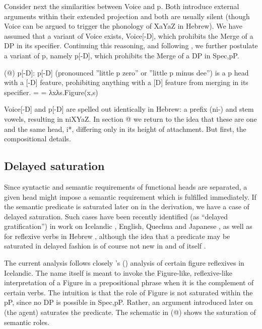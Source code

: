 Consider next the similarities between Voice and p. Both introduce external arguments within their extended projection and both are usually silent (though Voice can be argued to trigger the phonology of XaYaZ in Hebrew). We have assumed that a variant of Voice exists, Voice[-D], which prohibits the Merge of a DP in its specifier. Continuing this reasoning, and following \cite{wood15springer}, we further postulate a variant of p, namely p[-D], which prohibits the Merge of a DP in Spec,pP.

(@)    p[-D]:
    p[-D] (pronounced ''little p zero'' or ''little p minus dee'') is a p head with a [-D] feature, prohibiting anything with a [D] feature from merging in its specifier.
     =  = λxλs.Figure(x,s)

    Voice[-D] and p[-D] are spelled out identically in Hebrew: a prefix (ni-) and stem vowels, resulting in niXYaZ. In section @ we return to the idea that these are one and the same head, i*, differing only in its height of attachment. But first, the compositional details.

	\subsection{Delayed saturation}

Since syntactic and semantic requirements of functional heads are separated, a given head might impose a semantic requirement which is fulfilled immediately. If the semantic predicate is saturated later on in the derivation, we have a case of delayed saturation. Such cases have been recently identified (as “delayed gratification”) in work on Icelandic \citep{wood14nllt,wood15springer}, English, Quechua \citep{myler16mit} and Japanese \citep{woodmarantz17}, as well as for reflexive verbs in Hebrew \citep{kastner17gjgl}, although the idea that a predicate may be saturated in delayed fashion is of course not new in and of itself \citep{higginbotham85}.

The current analysis follows closely \citeauthor{wood15springer}’s (\citeyear{wood15springer}) analysis of certain figure reflexives in Icelandic. The name itself is meant to invoke the Figure-like, reflexive-like interpretation of a Figure in a prepositional phrase when it is the complement of certain verbs. The intuition is that the role of Figure is not saturated within the pP, since no DP is possible in Spec,pP. Rather, an argument introduced later on (the agent) saturates the predicate. The schematic in (@) shows the saturation of semantic roles.

